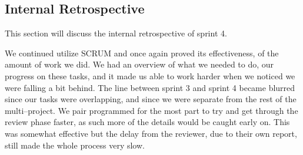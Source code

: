 \subsection*{Internal Retrospective}
This section will discuss the internal retrospective of sprint 4.

We continued utilize SCRUM and once again proved its effectiveness, of the amount of work we did.
We had an overview of what we needed to do, our progress on these tasks, and it made us able to work harder when we noticed we were falling a bit behind.
The line between sprint 3 and sprint 4 became blurred since our tasks were overlapping, and since we were separate from the rest of the multi--project.
We pair programmed for the most part to try and get through the review phase faster, as such more of the details would be caught early on.
This was somewhat effective but the delay from the reviewer, due to their own report, still made the whole process very slow.
